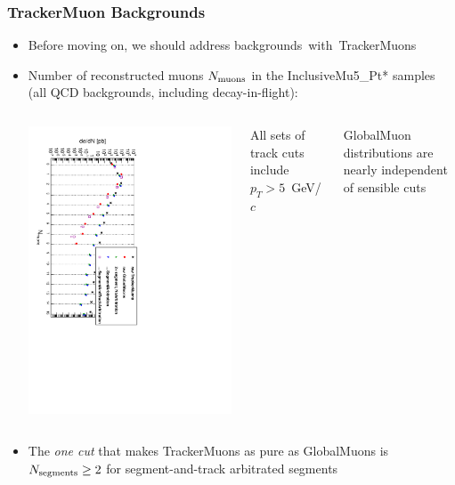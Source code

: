 \documentclass[compress]{beamer}
\newcommand{\s}[1]{{\mbox{\scriptsize #1}}}
\begin{document}
\begin{frame}
\frametitle{TrackerMuon Backgrounds}
\begin{itemize}
\item Before moving on, we should address \mbox{backgrounds with TrackerMuons\hspace{-1 cm}}
\item Number of reconstructed muons $N_\s{muons}$ in the InclusiveMu5\_Pt* samples (all QCD backgrounds, including decay-in-flight):

\begin{center}
\begin{columns}
\includegraphics[height=\linewidth, angle=90]{tracks_lastpage_allreal.pdf}

\scriptsize All sets of track cuts include $p_T > 5$~GeV/$c$

\vspace{0.25 cm} GlobalMuon distributions are nearly independent of sensible cuts
\end{columns}
\end{center}

\item The {\it one cut} that makes TrackerMuons as pure as GlobalMuons
  is $N_\s{segments} \ge 2$ for segment-and-track arbitrated segments
\end{itemize}
\end{frame}
\end{document}
